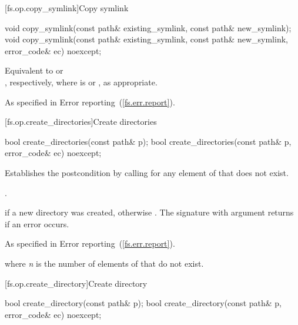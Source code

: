 [fs.op.copy_symlink]{Copy symlink}

%
\begin{itemdecl}
void copy_symlink(const path& existing_symlink, const path& new_symlink);
void copy_symlink(const path& existing_symlink, const path& new_symlink,
                  error_code& ec) noexcept;
\end{itemdecl}

\begin{itemdescr}
\pnum
\effects Equivalent to
 or\\
, respectively,
  where  is  or
  , as appropriate.

\pnum
\throws As specified in Error reporting~(\ref{fs.err.report}).
\end{itemdescr}


[fs.op.create_directories]{Create directories}

%
\begin{itemdecl}
bool create_directories(const path& p);
bool create_directories(const path& p, error_code& ec) noexcept;
\end{itemdecl}

\begin{itemdescr}
\pnum
\effects Establishes the postcondition by calling  for any element of  that does not
  exist.

\pnum
\postconditions {}.

\pnum
\returns {} if a new directory was created, otherwise . The signature with argument  returns  if an
  error occurs.

\pnum
\throws As specified in Error reporting~(\ref{fs.err.report}).

\pnum
\complexity {} where \textit{n} is the number of elements
  of  that do not exist.
\end{itemdescr}


[fs.op.create_directory]{Create directory}

%
\begin{itemdecl}
bool create_directory(const path& p);
bool create_directory(const path& p, error_code& ec) noexcept;
\end{itemdecl}

